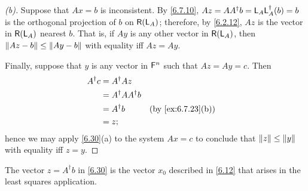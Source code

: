 \begin{proof}[(b)]
  Suppose that \(Ax = b\) is inconsistent.
  By \cref{6.7.10}, \(Az = A A^{\dag} b = \mathsf{L}_A \mathsf{L}_A^{\dag}(b) = b\) is the orthogonal projection of \(b\) on \(\rg{\L_A}\);
  therefore, by \cref{6.2.12}, \(Az\) is the vector in \(\rg{\L_A}\) nearest \(b\).
  That is, if \(Ay\) is any other vector in \(\rg{\L_A}\), then \(\left\lVert Az - b\right\rVert \leq \left\lVert Ay - b\right\rVert\) with equality iff \(Az = Ay\).

  Finally, suppose that \(y\) is any vector in \(\mathsf{F}^n\) such that \(Az = Ay = c\).
  Then
  \begin{align*}
    A^{\dag} c & = A^{\dag} A z                                 \\
               & = A^{\dag} A A^{\dag} b                        \\
               & = A^{\dag} b            &  & \by{ex:6.7.23}[b] \\
               & = z;
  \end{align*}
  hence we may apply \cref{6.30}(a) to the system \(Ax = c\) to conclude that \(\left\lVert z\right\rVert \leq \left\lVert y\right\rVert\) with equality iff \(z = y\).
\end{proof}

\begin{note}
  The vector \(z = A^{\dag} b\) in \cref{6.30} is the vector \(x_0\) described in \cref{6.12} that arises in the least squares application.
\end{note}

\exercisesection

